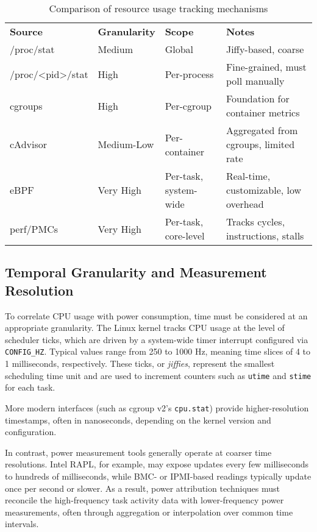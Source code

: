 \begin{table}[H]
\centering
\begin{tabular}{| m{3.2cm} | m{2cm}| m{3.6cm} | m{4cm} |}
\hline
\textbf{Source} & \textbf{Granularity} & \textbf{Scope} & \textbf{Notes} \\
\Xhline{1.5pt}
/proc/stat & Medium & Global & Jiffy-based, coarse \\
\hline
/proc/\textless pid\textgreater/stat & High & Per-process & Fine-grained, must poll manually \\
\hline
cgroups & High & Per-cgroup & Foundation for container metrics \\
\hline
cAdvisor & Medium-Low & Per-container & Aggregated from cgroups, limited rate \\
\hline
eBPF & Very High & Per-task, system-wide & Real-time, customizable, low overhead \\
\hline
perf/PMCs & Very High & Per-task, core-level & 	Tracks cycles, instructions, stalls\\
\hline
\end{tabular}
\caption{Comparison of resource usage tracking mechanisms}
\end{table}

\subsection{Temporal Granularity and Measurement Resolution}
\label{sec:granularity}
To correlate CPU usage with power consumption, time must be considered at an appropriate granularity. The Linux kernel tracks CPU usage at the level of scheduler ticks, which are driven by a system-wide timer interrupt configured via \texttt{CONFIG\_HZ}. Typical values range from 250 to 1000 Hz, meaning time slices of 4 to 1 milliseconds, respectively. These ticks, or \emph{jiffies}, represent the smallest scheduling time unit and are used to increment counters such as \texttt{utime} and \texttt{stime} for each task.

More modern interfaces (such as cgroup v2’s \texttt{cpu.stat}) provide higher-resolution timestamps, often in nanoseconds, depending on the kernel version and configuration.

In contrast, power measurement tools generally operate at coarser time resolutions. Intel RAPL, for example, may expose updates every few milliseconds to hundreds of milliseconds, while BMC- or IPMI-based readings typically update once per second or slower. As a result, power attribution techniques must reconcile the high-frequency task activity data with lower-frequency power measurements, often through aggregation or interpolation over common time intervals.

